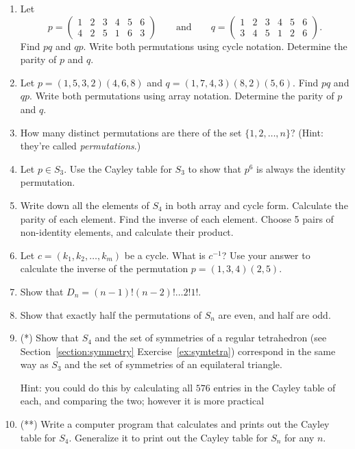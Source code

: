 \documentclass[10pt]{book}
\theoremstyle{break}
\begin{document}
\begin{enumerate}
  \item Let
    \[
      p = \begin{pmatrix}
        1 & 2 & 3 & 4 & 5 & 6 \\
        4 & 2 & 5 & 1 & 6 & 3
      \end{pmatrix}
      \qquad \text{and} \qquad
      q = \begin{pmatrix}
        1 & 2 & 3 & 4 & 5 & 6 \\
        3 & 4 & 5 & 1 & 2 & 6
      \end{pmatrix}.
    \]
    Find $pq$ and $qp$.  Write both permutations using cycle notation.
    Determine the parity of $p$ and $q$.
  
  \item Let $p = (1, 5, 3, 2)(4, 6, 8)$ and $q = (1, 7, 4, 3)(8, 2)(5, 6)$.
    Find $pq$ and $qp$.  Write both permutations using array notation.
    Determine the parity of $p$ and $q$.

  \item How many distinct permutations are there of the set $\{1, 2,
    \ldots, n\}$? (Hint: they're called \emph{permutations}.)
  
  \item Let $p \in S_{3}$.  Use the Cayley table for $S_{3}$ to show that
    $p^{6}$ is always the identity permutation.
  
  \item Write down all the elements of $S_{4}$ in both array and cycle form.
    Calculate the parity of each element.
    Find the inverse of each element.
    Choose 5 pairs of non-identity elements, and calculate their product.
  
  \item Let $c = (k_{1}, k_{2}, \ldots, k_{m})$ be a cycle.  What is $c^{-1}$?
    Use your answer to calculate the inverse of the permutation
    $p = (1,3,4)(2,5)$.
  
  \item Show that $D_{n} = (n-1)! (n-2)! \ldots 2! 1!$.
  
  \item Show that exactly half the permutations of $S_{n}$ are even, and half
    are odd.
  
  \item (*) Show that $S_{4}$ and the set of symmetries of a regular tetrahedron
    (see Section~\ref{section:symmetry} Exercise~\ref{ex:symtetra}) correspond
    in the same way as $S_{3}$ and the set of symmetries of an equilateral
    triangle.
    
    Hint: you could do this by calculating all $576$ entries in the Cayley
    table of each, and comparing the two; however it is more practical
  
  \item (**) Write a computer program that calculates and prints out the
    Cayley table for $S_{4}$.  Generalize it to print out the Cayley table
    for $S_{n}$ for any $n$.
\end{enumerate}
\end{document}
